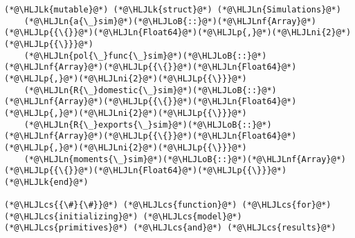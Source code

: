 \documentclass[12pt,a4paper]{article}
\newcommand{\HLJLk}[1]{\textcolor[RGB]{148,91,176}{\textbf{#1}}}
\newcommand{\HLJLn}[1]{#1}
\newcommand{\HLJLnf}[1]{\textcolor[RGB]{66,102,213}{#1}}
\newcommand{\HLJLni}[1]{\textcolor[RGB]{59,151,46}{#1}}
\newcommand{\HLJLoB}[1]{\textcolor[RGB]{102,102,102}{\textbf{#1}}}
\newcommand{\HLJLp}[1]{#1}
\newcommand{\HLJLcs}[1]{\textcolor[RGB]{153,153,119}{\textit{#1}}}
\begin{document}
\begin{lstlisting}
(*@\HLJLk{mutable}@*) (*@\HLJLk{struct}@*) (*@\HLJLn{Simulations}@*)
    (*@\HLJLn{a{\_}sim}@*)(*@\HLJLoB{::}@*)(*@\HLJLnf{Array}@*)(*@\HLJLp{{\{}}@*)(*@\HLJLn{Float64}@*)(*@\HLJLp{,}@*)(*@\HLJLni{2}@*)(*@\HLJLp{{\}}}@*)
    (*@\HLJLn{pol{\_}func{\_}sim}@*)(*@\HLJLoB{::}@*)(*@\HLJLnf{Array}@*)(*@\HLJLp{{\{}}@*)(*@\HLJLn{Float64}@*)(*@\HLJLp{,}@*)(*@\HLJLni{2}@*)(*@\HLJLp{{\}}}@*)
    (*@\HLJLn{R{\_}domestic{\_}sim}@*)(*@\HLJLoB{::}@*)(*@\HLJLnf{Array}@*)(*@\HLJLp{{\{}}@*)(*@\HLJLn{Float64}@*)(*@\HLJLp{,}@*)(*@\HLJLni{2}@*)(*@\HLJLp{{\}}}@*)
    (*@\HLJLn{R{\_}exports{\_}sim}@*)(*@\HLJLoB{::}@*)(*@\HLJLnf{Array}@*)(*@\HLJLp{{\{}}@*)(*@\HLJLn{Float64}@*)(*@\HLJLp{,}@*)(*@\HLJLni{2}@*)(*@\HLJLp{{\}}}@*)
    (*@\HLJLn{moments{\_}sim}@*)(*@\HLJLoB{::}@*)(*@\HLJLnf{Array}@*)(*@\HLJLp{{\{}}@*)(*@\HLJLn{Float64}@*)(*@\HLJLp{{\}}}@*)
(*@\HLJLk{end}@*)

(*@\HLJLcs{{\#}{\#}}@*) (*@\HLJLcs{function}@*) (*@\HLJLcs{for}@*) (*@\HLJLcs{initializing}@*) (*@\HLJLcs{model}@*) (*@\HLJLcs{primitives}@*) (*@\HLJLcs{and}@*) (*@\HLJLcs{results}@*)


\end{lstlisting}
\end{document}
